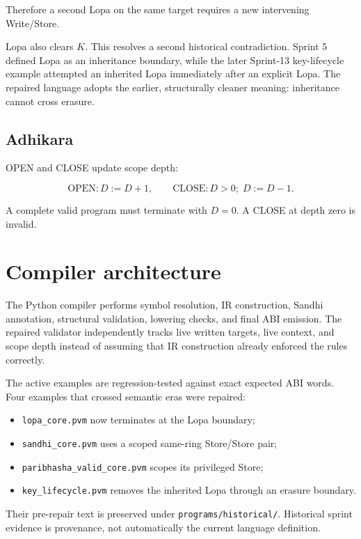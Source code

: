 \documentclass[11pt,a4paper]{article}
\begin{document}
Therefore a second Lopa on the same target requires a new intervening
Write/Store.

Lopa also clears $K$. This resolves a second historical contradiction.
Sprint 5 defined Lopa as an inheritance boundary, while the later Sprint-13
key-lifecycle example attempted an inherited Lopa immediately after an
explicit Lopa. The repaired language adopts the earlier, structurally cleaner
meaning: inheritance cannot cross erasure.

\subsection{Adhikara}

OPEN and CLOSE update scope depth:

\[
\mathrm{OPEN}: D := D+1,
\qquad
\mathrm{CLOSE}: D>0;\; D := D-1.
\]

A complete valid program must terminate with $D=0$. A CLOSE at depth zero is
invalid.

\section{Compiler architecture}

The Python compiler performs symbol resolution, IR construction, Sandhi
annotation, structural validation, lowering checks, and final ABI emission.
The repaired validator independently tracks live written targets, live context,
and scope depth instead of assuming that IR construction already enforced the
rules correctly.

The active examples are regression-tested against exact expected ABI words.
Four examples that crossed semantic eras were repaired:

\begin{itemize}
\item \texttt{lopa\_core.pvm} now terminates at the Lopa boundary;
\item \texttt{sandhi\_core.pvm} uses a scoped same-ring Store/Store pair;
\item \texttt{paribhasha\_valid\_core.pvm} scopes its privileged Store;
\item \texttt{key\_lifecycle.pvm} removes the inherited Lopa through an
      erasure boundary.
\end{itemize}

Their pre-repair text is preserved under \texttt{programs/historical/}.
Historical sprint evidence is provenance, not automatically the current
language definition.
\end{document}
